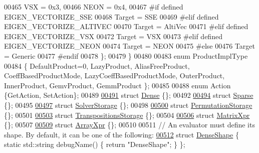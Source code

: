 \begin{DoxyCode}
00465     VSX = 0x3,
00466     NEON = 0x4,
00467 \textcolor{preprocessor}{#if defined EIGEN\_VECTORIZE\_SSE}
00468     Target = SSE
00469 \textcolor{preprocessor}{#elif defined EIGEN\_VECTORIZE\_ALTIVEC}
00470     Target = AltiVec
00471 \textcolor{preprocessor}{#elif defined EIGEN\_VECTORIZE\_VSX}
00472     Target = VSX
00473 \textcolor{preprocessor}{#elif defined EIGEN\_VECTORIZE\_NEON}
00474     Target = NEON
00475 \textcolor{preprocessor}{#else}
00476     Target = Generic
00477 \textcolor{preprocessor}{#endif}
00478   \};
00479 \}
00480 
00483 \textcolor{keyword}{enum} ProductImplType
00484 \{ DefaultProduct=0, LazyProduct, AliasFreeProduct, CoeffBasedProductMode, LazyCoeffBasedProductMode, 
      OuterProduct, InnerProduct, GemvProduct, GemmProduct \};
00485 
00488 \textcolor{keyword}{enum} Action \{GetAction, SetAction\};
00489 
\hyperlink{struct_eigen_1_1_dense}{00491} \textcolor{keyword}{struct }\hyperlink{struct_eigen_1_1_dense}{Dense} \{\};
00492 
\hyperlink{struct_eigen_1_1_sparse}{00494} \textcolor{keyword}{struct }\hyperlink{struct_eigen_1_1_sparse}{Sparse} \{\};
00495 
\hyperlink{struct_eigen_1_1_solver_storage}{00497} \textcolor{keyword}{struct }\hyperlink{struct_eigen_1_1_solver_storage}{SolverStorage} \{\};
00498 
\hyperlink{struct_eigen_1_1_permutation_storage}{00500} \textcolor{keyword}{struct }\hyperlink{struct_eigen_1_1_permutation_storage}{PermutationStorage} \{\};
00501 
\hyperlink{struct_eigen_1_1_transpositions_storage}{00503} \textcolor{keyword}{struct }\hyperlink{struct_eigen_1_1_transpositions_storage}{TranspositionsStorage} \{\};
00504 
\hyperlink{struct_eigen_1_1_matrix_xpr}{00506} \textcolor{keyword}{struct }\hyperlink{struct_eigen_1_1_matrix_xpr}{MatrixXpr} \{\};
00507 
\hyperlink{struct_eigen_1_1_array_xpr}{00509} \textcolor{keyword}{struct }\hyperlink{struct_eigen_1_1_array_xpr}{ArrayXpr} \{\};
00510 
00511 \textcolor{comment}{// An evaluator must define its shape. By default, it can be one of the following:}
\hyperlink{struct_eigen_1_1_dense_shape}{00512} \textcolor{keyword}{struct }\hyperlink{struct_eigen_1_1_dense_shape}{DenseShape}             \{ \textcolor{keyword}{static} std::string debugName() \{ \textcolor{keywordflow}{return} \textcolor{stringliteral}{"DenseShape"}; \} \};

\end{DoxyCode}
